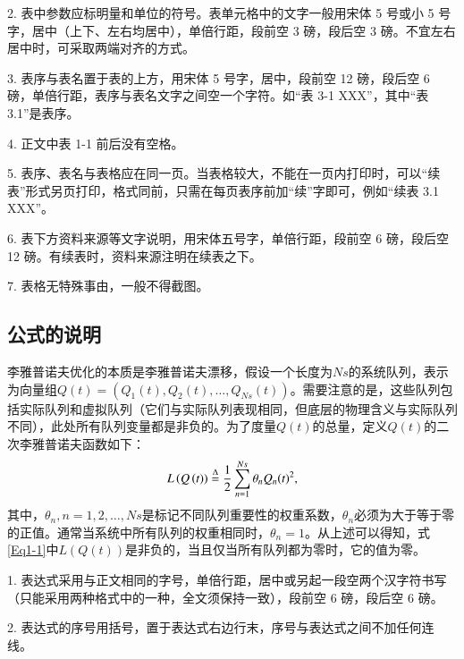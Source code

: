 \textcolor[rgb]{1.00,0.00,0.00}{2. 表中参数应标明量和单位的符号。表单元格中的文字一般用宋体 5 号或小 5 号字，居中（上下、左右均居中），单倍行距，段前空 3 磅，段后空 3 磅。不宜左右居中时，可采取两端对齐的方式。}

\textcolor[rgb]{1.00,0.00,0.00}{3. 表序与表名置于表的上方，用宋体 5 号字，居中，段前空 12 磅，段后空 6 磅，单倍行距，表序与表名文字之间空一个字符。如“表 3-1 XXX”，其中“表 3.1”是表序。}

\textcolor[rgb]{1.00,0.00,0.00}{4. 正文中表 1-1 前后没有空格。}

\textcolor[rgb]{1.00,0.00,0.00}{5. 表序、表名与表格应在同一页。当表格较大，不能在一页内打印时，可以“续表”形式另页打印，格式同前，只需在每页表序前加“续”字即可，例如“续表 3.1 XXX”。}

\textcolor[rgb]{1.00,0.00,0.00}{6. 表下方资料来源等文字说明，用宋体五号字，单倍行距，段前空 6 磅，段后空 12 磅。有续表时，资料来源注明在续表之下。}

\textcolor[rgb]{1.00,0.00,0.00}{7. 表格无特殊事由，一般不得截图。}

\subsection{公式的说明}

李雅普诺夫优化的本质是李雅普诺夫漂移，假设一个长度为$Ns$的系统队列，表示为向量组$Q\left( t \right) = \left( {{Q_1}\left( t \right),{Q_2}\left( t \right), \ldots ,{Q_{Ns}}\left( t \right)} \right)$。需要注意的是，这些队列包括实际队列和虚拟队列（它们与实际队列表现相同，但底层的物理含义与实际队列不同），此处所有队列变量都是非负的。为了度量$Q\left( t \right)$的总量，定义$Q\left( t \right)$的二次李雅普诺夫函数如下：
\begin{equation}\label{Eq1-1}
	L\left( {Q\left( t \right)} \right) \buildrel \Delta \over = \frac{1}{2}\sum\limits_{n = 1}^{Ns} {{\theta _n}{Q_n}{{\left( t \right)}^2}},
\end{equation}
其中，${\theta _n},n = 1,2, \ldots ,Ns$是标记不同队列重要性的权重系数，${\theta _n}$必须为大于等于零的正值。通常当系统中所有队列的权重相同时，${\theta _n} = 1$。从上述可以得知，式\eqref{Eq1-1}中$L\left( {Q\left( t \right)} \right)$是非负的，当且仅当所有队列都为零时，它的值为零。

\textcolor[rgb]{1.00,0.00,0.00}{1. 表达式采用与正文相同的字号，单倍行距，居中或另起一段空两个汉字符书写（只能采用两种格式中的一种，全文须保持一致），段前空 6 磅，段后空 6 磅。}

\textcolor[rgb]{1.00,0.00,0.00}{2. 表达式的序号用括号，置于表达式右边行末，序号与表达式之间不加任何连线。}


